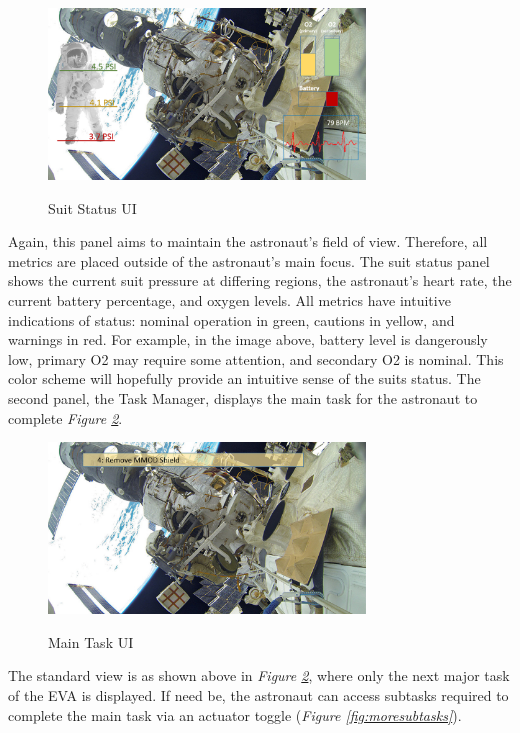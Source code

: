 \documentclass{article}
\begin{document}
\begin{figure}[!htb]
  \centering
  \caption{Suit Status UI}
  \includegraphics[width=0.75\textwidth]{assets/moresuitmetrics.png}
  \label{fig:moresuitmetrics}
\end{figure}

Again, this panel aims to maintain the astronaut’s field of view. Therefore, all metrics are placed outside of the astronaut’s main focus. The suit status panel shows the current suit pressure at differing regions, the astronaut’s heart rate, the current battery percentage, and oxygen levels. All metrics have intuitive indications of status: nominal operation in green, cautions in yellow, and warnings in red. For example, in the image above, battery level is dangerously low, primary O2 may require some attention, and secondary O2 is nominal. This color scheme will hopefully provide an intuitive sense of the suits status. The second panel, the Task Manager, displays the main task for the astronaut to complete \textit{Figure \ref{fig:task4}}.

\begin{figure}[!htb]
  \centering
  \caption{Main Task UI}
  \includegraphics[width=0.75\textwidth]{assets/task4.png}
  \label{fig:task4}
\end{figure}

The standard view is as shown above in \textit{Figure \ref{fig:task4}}, where only the next major task of the EVA is displayed. If need be, the astronaut can access subtasks required to complete the main task via an actuator toggle (\textit{Figure \ref{fig:moresubtasks}}).
\end{document}
